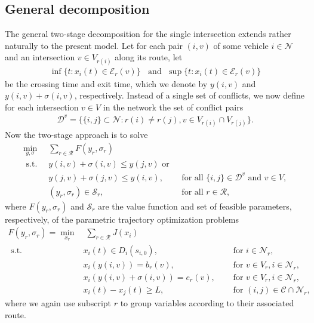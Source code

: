 \documentclass[a4paper]{article}
\theoremstyle{definition}
\theoremstyle{plain}
\begin{document}
\subsection{General decomposition}
The general two-stage decomposition for the single intersection extends rather
naturally to the present model. Let for each pair $(i,v)$ of some vehicle
$i \in \mathcal{N}$ and an intersection $v \in V_{r(i)}$ along its route, let
\begin{align*}
\inf \{ t: x_{i}(t) \in \mathcal{E}_{r}(v) \} \;\; \text{ and } \; \sup \{ t: x_{i}(t) \in \mathcal{E}_{r}(v) \}
\end{align*}
be the crossing time and exit time, which we denote by $y(i,v)$ and
$y(i,v) + \sigma(i, v)$, respectively.
%
Instead of a single set of conflicts, we now define for each intersection
$v \in V$ in the network the set of conflict pairs
\begin{align*}
\mathcal{D}^{v} = \{ \{i,j\} \subset \mathcal{N} : r(i) \neq r(j), v \in V_{r(i)} \cap V_{r(j)} \} .
\end{align*}
Now the two-stage approach is to solve
\begin{align*}
  \min_{y,\sigma} \;\; & \sum_{r \in \mathcal{R}} F(y_{r}, \sigma_{r}) \\
  \text{ s.t. } & y(i,v) + \sigma(i,v) \leq y(j,v) \text{ or }  \\
                & y(j,v) + \sigma(j,v) \leq y(i,v) , & \text{ for all } \{i,j\} \in \mathcal{D}^{v} \text{ and } v \in V, \\
  & (y_{r}, \sigma_{r}) \in \mathcal{S}_{r} , \quad & \text{ for all } r \in \mathcal{R} ,
\end{align*}
%
where $F(y_{r}, \sigma_{r})$ and $\mathcal{S}_{r}$ are the value function and
set of feasible parameters, respectively, of the parametric trajectory
optimization problems
%
\begin{align*}
  F(y_{r}, \sigma_{r}) = \min_{x_{r}} & \; \sum_{r \in \mathcal{R}} J(x_{i}) \\
  \text{ s.t. } & x_{i}(t) \in D_{i}(s_{i,0}) , \quad & \text{ for } i \in \mathcal{N}_{r} , \\
  & x_{i}(y(i,v)) = b_{r}(v) , \quad & \text{ for } v \in V_{r} , i \in \mathcal{N}_{r} , \\
  & x_{i}(y(i,v) + \sigma(i,v)) = e_{r}(v) , \quad & \text{ for } v \in V_{r} , i \in \mathcal{N}_{r} , \\
  & x_{i}(t) - x_{j}(t) \geq L , \quad & \text{ for } (i, j) \in \mathcal{C} \cap \mathcal{N}_{r} ,
\end{align*}
where we again use subscript $r$ to group variables according to their associated route.
\end{document}
